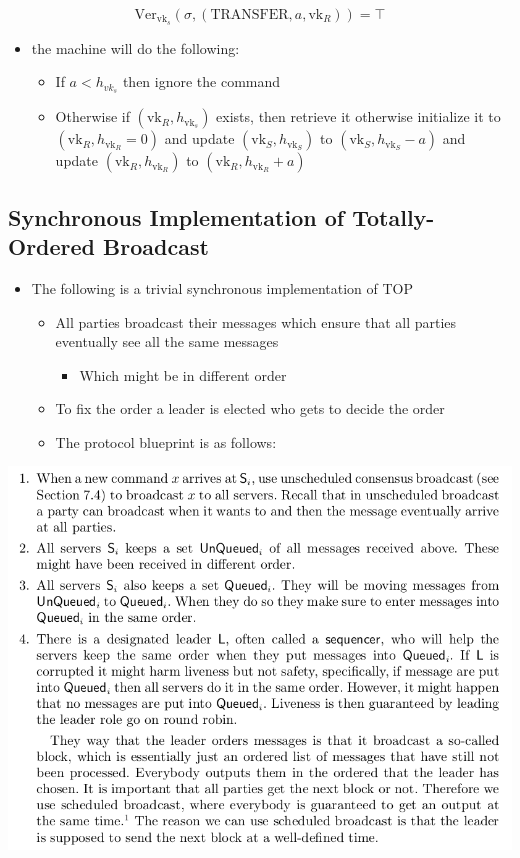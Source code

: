 \documentclass[11pt]{article}
\begin{document}
\begin{equation}
  \text{Ver}_{\text{vk}_s}(\sigma, (\text{TRANSFER}, a, \text{vk}_R)) = \top
\end{equation}
\begin{itemize}
\item the machine will do the following:
\begin{itemize}
\item If \(a<h_{vk}_s\) then ignore the command
\item Otherwise if \((\text{vk}_R,h_{\text{vk}_s})\) exists, then retrieve it otherwise initialize it to \((\text{vk}_R,h_{\text{vk}_R} = 0)\) and update \((\text{vk}_S,h_{\text{vk}_S})\) to \((\text{vk}_S,h_{\text{vk}_S}-a)\) and update \((\text{vk}_R,h_{\text{vk}_R})\) to \((\text{vk}_R,h_{\text{vk}_R}+a)\)
\end{itemize}
\end{itemize}

\subsection{Synchronous Implementation of Totally-Ordered Broadcast}
\label{sec:org03dbd52}
\begin{itemize}
\item The following is a trivial synchronous implementation of TOP
\begin{itemize}
\item All parties broadcast their messages which ensure that all parties eventually see all the same messages
\begin{itemize}
\item Which might be in different order
\end{itemize}
\item To fix the order a leader is elected who gets to decide the order
\item The protocol blueprint is as follows:
\end{itemize}
\end{itemize}
\begin{center}
\includegraphics[width=.9\linewidth]{State Machine Replication (10)/screenshot_2018-10-21_10-28-32.png}
\end{center}
\end{document}
